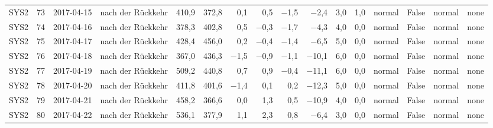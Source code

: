 \begin{tabular}{lrllrrrrrrrrlrll}
SYS2 & 73 & 2017-04-15 & nach der Rückkehr & 410,9 & 372,8 & 0,1 & 0,5 & $-$1,5 & $-$2,4 & 3,0 & 1,0 & normal & False & normal & none \\
SYS2 & 74 & 2017-04-16 & nach der Rückkehr & 378,3 & 402,8 & 0,5 & $-$0,3 & $-$1,7 & $-$4,3 & 4,0 & 0,0 & normal & False & normal & none \\
SYS2 & 75 & 2017-04-17 & nach der Rückkehr & 428,4 & 456,0 & 0,2 & $-$0,4 & $-$1,4 & $-$6,5 & 5,0 & 0,0 & normal & False & normal & none \\
SYS2 & 76 & 2017-04-18 & nach der Rückkehr & 367,0 & 436,3 & $-$1,5 & $-$0,9 & $-$1,1 & $-$10,1 & 6,0 & 0,0 & normal & False & normal & none \\
SYS2 & 77 & 2017-04-19 & nach der Rückkehr & 509,2 & 440,8 & 0,7 & 0,9 & $-$0,4 & $-$11,1 & 6,0 & 0,0 & normal & False & normal & none \\
SYS2 & 78 & 2017-04-20 & nach der Rückkehr & 411,8 & 401,6 & $-$1,4 & 0,1 & 0,2 & $-$12,3 & 5,0 & 0,0 & normal & False & normal & none \\
SYS2 & 79 & 2017-04-21 & nach der Rückkehr & 458,2 & 366,6 & 0,0 & 1,3 & 0,5 & $-$10,9 & 4,0 & 0,0 & normal & False & normal & none \\
SYS2 & 80 & 2017-04-22 & nach der Rückkehr & 536,1 & 377,9 & 1,1 & 2,3 & 0,8 & $-$6,4 & 3,0 & 0,0 & normal & False & normal & none \\
\bottomrule
\end{tabular}
